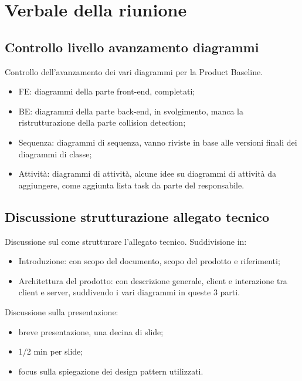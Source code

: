 
\section{Verbale della riunione}

\subsection{Controllo livello avanzamento diagrammi}
Controllo dell'avanzamento dei vari diagrammi per la Product Baseline.
\begin{itemize}
	\item {FE:} diagrammi della parte front-end, completati;
	\item {BE:} diagrammi della parte back-end, in svolgimento, manca la ristrutturazione della parte collision detection;
	\item {Sequenza:} diagrammi di sequenza, vanno riviste in base alle versioni finali dei diagrammi di classe;
	\item {Attività:} diagrammi di attività, alcune idee su diagrammi di attività da aggiungere, come aggiunta lista task da parte del responsabile.
\end{itemize}

\subsection{Discussione strutturazione allegato tecnico}
Discussione sul come strutturare l'allegato tecnico.
Suddivisione in:
\begin{itemize}
	\item {Introduzione:} con scopo del documento, scopo del prodotto e riferimenti;
	\item {Architettura del prodotto:} con descrizione generale, client e interazione tra client e server, suddivendo i vari diagrammi in queste 3 parti.
\end{itemize}
Discussione sulla presentazione:
\begin{itemize}
	\item breve presentazione, una decina di slide;
	\item 1/2 min per slide;
	\item focus sulla spiegazione dei design pattern utilizzati.
\end{itemize}

